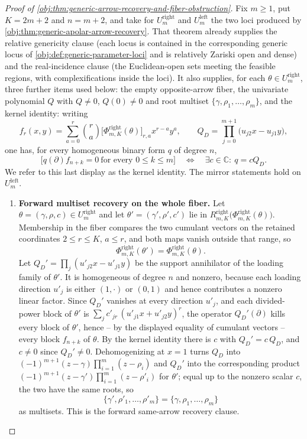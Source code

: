 \documentclass[11pt]{article}
\begin{document}
\begin{proof}[Proof of \cref{obj:thm:generic-arrow-recovery-and-fiber-obstruction}]
Fix \(m\ge 1\), put \(K=2m+2\) and \(n=m+2\), and take for \(U^{\mathrm{right}}_m\) and \(U^{\mathrm{left}}_m\) the two loci produced by \cref{obj:thm:generic-apolar-arrow-recovery}.  That theorem already supplies the relative genericity clause (each locus is contained in the corresponding generic locus of \cref{obj:def:generic-parameter-loci} and is relatively Zariski open and dense) and the real-incidence clause (the Euclidean-open sets meeting the feasible regions, with complexifications inside the loci).  It also supplies, for each \(\theta\in U^{\mathrm{right}}_m\), three further items used below: the empty opposite-arrow fiber, the univariate polynomial \(Q\) with \(Q\ne 0\), \(Q(0)\ne0\) and root multiset \(\{\gamma,\rho_1,\ldots,\rho_m\}\), and the kernel identity: writing
\[
f_r(x,y)=\sum_{a=0}^{r}\binom{r}{a}\bigl[\Phi^{\mathrm{right}}_{m,K}(\theta)\bigr]_{r,a}x^{r-a}y^{a},
\qquad
Q_D=\prod_{j=0}^{m+1}\bigl(u_{j2}x-u_{j1}y\bigr),
\]
one has, for every homogeneous binary form \(q\) of degree \(n\),
\[
\bigl[q(\partial)f_{n+k}=0\ \text{for every }0\le k\le m\bigr]
\quad\Longleftrightarrow\quad
\exists c\in\mathbb C:\ q=cQ_D .
\]
We refer to this last display as the kernel identity.
The mirror statements hold on \(U^{\mathrm{left}}_m\).

\begin{enumerate}
\item \textbf{Forward multiset recovery on the whole fiber.}  Let \(\theta=(\gamma,\rho,c)\in U^{\mathrm{right}}_m\) and let \(\theta'=(\gamma',\rho',c')\) lie in \(R^{\mathrm{right}}_{m,K}\bigl(\Phi^{\mathrm{right}}_{m,K}(\theta)\bigr)\).  Membership in the fiber compares the two cumulant vectors on the retained coordinates \(2\le r\le K\), \(a\le r\), and both maps vanish outside that range, so
\[
\Phi^{\mathrm{right}}_{m,K}(\theta')=\Phi^{\mathrm{right}}_{m,K}(\theta).
\]
Let \(Q_D'=\prod_{j}(u'_{j2}x-u'_{j1}y)\) be the support annihilator of the loading family of \(\theta'\).  It is homogeneous of degree \(n\) and nonzero, because each loading direction \(u'_j\) is either \((1,\cdot)\) or \((0,1)\) and hence contributes a nonzero linear factor.  Since \(Q_D'\) vanishes at every direction \(u'_j\), and each divided-power block of \(\theta'\) is \(\sum_j c'_{jr}\,(u'_{j1}x+u'_{j2}y)^{r}\), the operator \(Q_D'(\partial)\) kills every block of \(\theta'\), hence -- by the displayed equality of cumulant vectors -- every block \(f_{n+k}\) of \(\theta\).  By the kernel identity there is \(c\) with \(Q_D'=c\,Q_D\), and \(c\ne0\) since \(Q_D'\ne0\).  Dehomogenizing at \(x=1\) turns \(Q_D\) into \((-1)^{m+1}(z-\gamma)\prod_{i=1}^{m}(z-\rho_i)\) and \(Q_D'\) into the corresponding product \((-1)^{m+1}(z-\gamma')\prod_{i=1}^{m}(z-\rho'_i)\) for \(\theta'\); equal up to the nonzero scalar \(c\), the two have the same roots, so
\[
\{\gamma',\rho'_1,\ldots,\rho'_m\}=\{\gamma,\rho_1,\ldots,\rho_m\}
\]
as multisets.  This is the forward same-arrow recovery clause.


\end{enumerate}
\end{proof}
\end{document}
